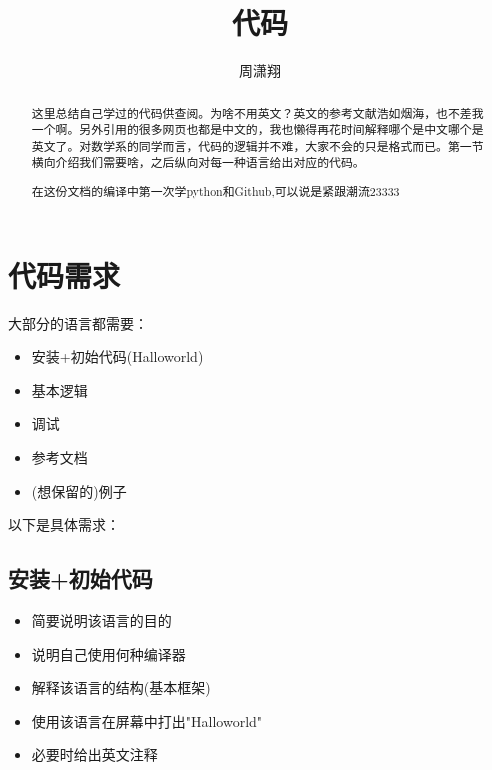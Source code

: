 \documentclass[11pt]{amsart}
\begin{document}
\date{}

\title
{代码}


\author{周潇翔}
\address{School of Mathematical Sciences\\
University of Science and Technology of China\\
Hefei, 230026\\ P.R. China\\} 





\begin{abstract}
这里总结自己学过的代码供查阅。为啥不用英文？英文的参考文献浩如烟海，也不差我一个啊。另外引用的很多网页也都是中文的，我也懒得再花时间解释哪个是中文哪个是英文了。对数学系的同学而言，代码的逻辑并不难，大家不会的只是格式而已。第一节横向介绍我们需要啥，之后纵向对每一种语言给出对应的代码。

在这份文档的编译中第一次学python和Github,可以说是紧跟潮流23333
\end{abstract}



\maketitle


\section{代码需求}

大部分的语言都需要：
\begin{itemize}
	\item 安装+初始代码(Halloworld)
	\item 基本逻辑
	\item 调试
	\item 参考文档
	\item (想保留的)例子
\end{itemize}
以下是具体需求：
\subsection{安装+初始代码}
\begin{itemize}
	\item 简要说明该语言的目的
	\item 说明自己使用何种编译器
	\item 解释该语言的结构(基本框架)
	\item 使用该语言在屏幕中打出"Halloworld"
	\item 必要时给出英文注释
\end{itemize}
\end{document}
